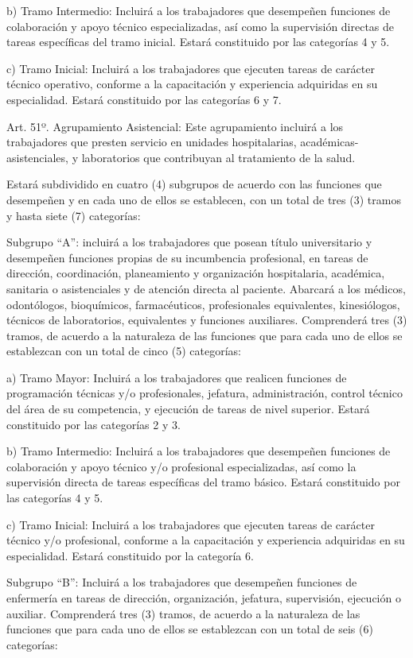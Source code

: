 \documentclass[]{article}
\begin{document}
b) Tramo Intermedio: Incluirá a los trabajadores que desempeñen
funciones de colaboración y apoyo técnico especializadas, así como la
supervisión directas de tareas específicas del tramo inicial. Estará
constituido por las categorías 4 y 5.

c) Tramo Inicial: Incluirá a los trabajadores que ejecuten tareas de
carácter técnico operativo, conforme a la capacitación y experiencia
adquiridas en su especialidad. Estará constituido por las categorías 6 y
7.

Art. 51º. Agrupamiento Asistencial: Este agrupamiento incluirá a los
trabajadores que presten servicio en unidades hospitalarias,
académicas-asistenciales, y laboratorios que contribuyan al tratamiento
de la salud.

Estará subdividido en cuatro (4) subgrupos de acuerdo con las funciones
que desempeñen y en cada uno de ellos se establecen, con un total de
tres (3) tramos y hasta siete (7) categorías:

Subgrupo ``A'': incluirá a los trabajadores que posean título
universitario y desempeñen funciones propias de su incumbencia
profesional, en tareas de dirección, coordinación, planeamiento y
organización hospitalaria, académica, sanitaria o asistenciales y de
atención directa al paciente. Abarcará a los médicos, odontólogos,
bioquímicos, farmacéuticos, profesionales equivalentes, kinesiólogos,
técnicos de laboratorios, equivalentes y funciones auxiliares.
Comprenderá tres (3) tramos, de acuerdo a la naturaleza de las funciones
que para cada uno de ellos se establezcan con un total de cinco (5)
categorías:

a) Tramo Mayor: Incluirá a los trabajadores que realicen funciones de
programación técnicas y/o profesionales, jefatura, administración,
control técnico del área de su competencia, y ejecución de tareas de
nivel superior. Estará constituido por las categorías 2 y 3.

b) Tramo Intermedio: Incluirá a los trabajadores que desempeñen
funciones de colaboración y apoyo técnico y/o profesional
especializadas, así como la supervisión directa de tareas específicas
del tramo básico. Estará constituido por las categorías 4 y 5.

c) Tramo Inicial: Incluirá a los trabajadores que ejecuten tareas de
carácter técnico y/o profesional, conforme a la capacitación y
experiencia adquiridas en su especialidad. Estará constituido por la
categoría 6.

Subgrupo ``B'': Incluirá a los trabajadores que desempeñen funciones de
enfermería en tareas de dirección, organización, jefatura, supervisión,
ejecución o auxiliar. Comprenderá tres (3) tramos, de acuerdo a la
naturaleza de las funciones que para cada uno de ellos se establezcan
con un total de seis (6) categorías:
\end{document}

